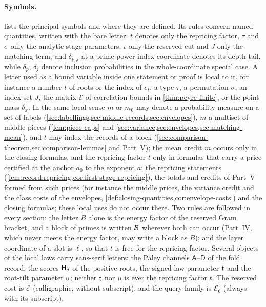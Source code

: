 \paragraph{Symbols.}
 lists the principal symbols and where they are defined.
Its rules concern named quantities, written with the bare letter: $t$ denotes
only the repricing factor, $\tau$ and $\sigma$ only the analytic-stage
parameters, $\iota$ only the reserved cut and $J$ only the matching term; and
$\delta_{p,j}$ at a prime-power index coordinate denotes its depth tail,
while $\delta_p$, $\delta_j$ denote inclusion probabilities in the
whole-coordinate special case. A letter used as a bound
variable inside one statement or proof is local to it, for instance a number
$t$ of roots or the index of $e_t$, a type $\tau$, a permutation $\sigma$, an
index set $J$, the matrix $\mathcal E$ of correlation bounds in
\cref{thm:peyre-finite}, or the point mass $\delta_x$. In the same local
sense $m$ or $m_0$ may denote a probability measure on a set of labels
(\cref{sec:labellings,sec:middle-records,sec:envelopes}), $m$ a multiset of
middle pieces (\cref{lem:piece-caps} and
\cref{sec:variance,sec:envelopes,sec:matching-mean}), and $t$ may index
the records of a block (\cref{sec:comparison-theorem,sec:comparison-lemmas}
and Part~V); the mean credit $m$ occurs only in the closing formulas, and the
repricing factor $t$ only in formulas that carry a price certified at the
anchor $a_0$ to the exponent $a$: the repricing statements
(\cref{lem:record:repricing,cor:first-stage-repricing}), the totals and
credits of Part~V formed from such prices (for instance the middle prices,
the variance credit and the class costs of the envelopes,
\cref{def:closing-quantities,cor:envelope-costs}) and the closing formulas;
these local uses do not occur there. Two rules are followed in every section: the letter $B$ alone is the energy
factor of the reserved Gram bracket, and a block of primes is written $\mathcal B$
wherever both can occur (Part~IV, which never meets the energy factor, may
write a block as $B$); and the layer coordinate of a slot is $\ell$, so that
$t$ is free for the repricing factor. Several objects of the local laws carry
sans-serif letters: the Paley channels $\mathsf A$--$\mathsf D$ of the fold
record, the scores $\mathsf H_{j}$ of the positive roots, the signed-law parameter
$\mathsf t$ and the root-tilt parameter $\mathsf u$; neither $\mathsf t$ nor $\mathsf u$ is
ever the repricing factor $t$. The reserved cost is $\mathcal E$
(calligraphic, without subscript), and the query family is $\mathcal E_6$
(always with its subscript).

